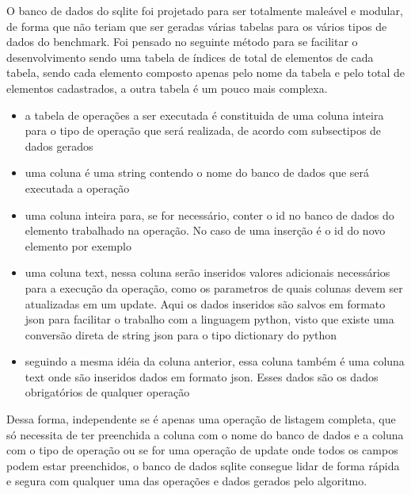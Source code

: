 \documentclass[
	12pt,				%
	openright,			%
	oneside,			%
	a4paper,			%
	english,			%
	french,				%
	spanish,			%
	brazil,				%
	]{abntex2}
\begin{document}
O banco de dados do sqlite foi projetado para ser totalmente maleável e modular, de forma que não teriam que ser geradas várias tabelas para os vários tipos de dados do benchmark. Foi pensado no seguinte método para se facilitar o desenvolvimento sendo uma tabela de índices de total de elementos de cada tabela, sendo cada elemento composto apenas pelo nome da tabela e pelo total de elementos cadastrados, a outra tabela é um pouco mais complexa.
\begin{itemize}
    \item a tabela de operações a ser executada é constituida de uma coluna inteira para o tipo de operação que será realizada, de acordo com {subsec}{tipos de dados gerados}
    \item uma coluna é uma string contendo o nome do banco de dados que será executada a operação
    \item uma coluna inteira para, se for necessário, conter o id no banco de dados do elemento trabalhado na operação. No caso de uma inserção é o id do novo elemento por exemplo
    \item uma coluna text, nessa coluna serão inseridos valores adicionais necessários para a execução da operação, como os parametros de quais colunas devem ser atualizadas em um update. Aqui os dados inseridos são salvos em formato json para facilitar o trabalho com a linguagem python, visto que existe uma conversão direta de string json para o tipo dictionary do python
    \item seguindo a mesma idéia da coluna anterior, essa coluna também é uma coluna text onde são inseridos dados em formato json. Esses dados são os dados obrigatórios de qualquer operação
\end{itemize}
 Dessa forma, independente se é apenas uma operação de listagem completa, que só necessita de ter preenchida a coluna com o nome do banco de dados e a coluna com o tipo de operação ou se for uma operação de update onde todos os campos podem estar preenchidos, o banco de dados sqlite consegue lidar de forma rápida e segura com qualquer uma das operações e dados gerados pelo algoritmo.
\end{document}
